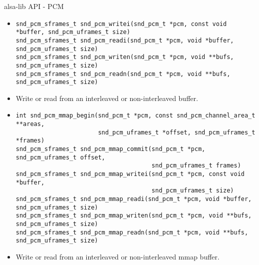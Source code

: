 \begin{frame}[fragile]{alsa-lib API - PCM}
  \begin{itemize}
  \item
    \begin{block}{}
    \fontsize{9}{9}\selectfont
      \begin{verbatim}
snd_pcm_sframes_t snd_pcm_writei(snd_pcm_t *pcm, const void *buffer, snd_pcm_uframes_t size)
snd_pcm_sframes_t snd_pcm_readi(snd_pcm_t *pcm, void *buffer, snd_pcm_uframes_t size)
snd_pcm_sframes_t snd_pcm_writen(snd_pcm_t *pcm, void **bufs, snd_pcm_uframes_t size)
snd_pcm_sframes_t snd_pcm_readn(snd_pcm_t *pcm, void **bufs, snd_pcm_uframes_t size)
      \end{verbatim}
    \end{block}
  \item Write or read from an interleaved or non-interleaved buffer.
  \item
    \begin{block}{}
    \fontsize{9}{9}\selectfont
      \begin{verbatim}
int snd_pcm_mmap_begin(snd_pcm_t *pcm, const snd_pcm_channel_area_t **areas,
                       snd_pcm_uframes_t *offset, snd_pcm_uframes_t *frames)
snd_pcm_sframes_t snd_pcm_mmap_commit(snd_pcm_t *pcm, snd_pcm_uframes_t offset,
                                      snd_pcm_uframes_t frames)
snd_pcm_sframes_t snd_pcm_mmap_writei(snd_pcm_t *pcm, const void *buffer,
                                      snd_pcm_uframes_t size)
snd_pcm_sframes_t snd_pcm_mmap_readi(snd_pcm_t *pcm, void *buffer, snd_pcm_uframes_t size)
snd_pcm_sframes_t snd_pcm_mmap_writen(snd_pcm_t *pcm, void **bufs, snd_pcm_uframes_t size)
snd_pcm_sframes_t snd_pcm_mmap_readn(snd_pcm_t *pcm, void **bufs, snd_pcm_uframes_t size)
      \end{verbatim}
    \end{block}
  \item Write or read from an interleaved or non-interleaved mmap buffer.
  \end{itemize}
\end{frame}

